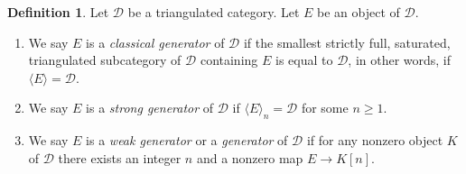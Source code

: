 \documentclass{amsart}
\theoremstyle{plain}
\theoremstyle{definition}
\newtheorem{definition}[subsection]{Definition}
\theoremstyle{remark}
\numberwithin{equation}{subsection}
\begin{document}
\begin{definition}
\label{derived-definition-generators}
Let $\mathcal{D}$ be a triangulated category. Let $E$ be an object
of $\mathcal{D}$.
\begin{enumerate}
\item We say $E$ is a {\it classical generator} of $\mathcal{D}$
if the smallest strictly full, saturated, triangulated subcategory
of $\mathcal{D}$ containing $E$ is equal to $\mathcal{D}$, in
other words, if $\langle E \rangle = \mathcal{D}$.
\item We say $E$ is a {\it strong generator} of $\mathcal{D}$
if $\langle E \rangle_n = \mathcal{D}$ for some $n \geq 1$.
\item We say $E$ is a {\it weak generator} or a {\it generator}
of $\mathcal{D}$
if for any nonzero object $K$ of $\mathcal{D}$ there exists
an integer $n$ and a nonzero map $E \to K[n]$.
\end{enumerate}
\end{definition}
\end{document}
